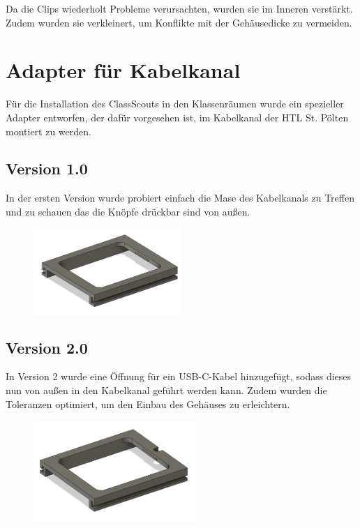 \begin{inhalt}
Da die Clips wiederholt Probleme verursachten, wurden sie im Inneren verstärkt.  
Zudem wurden sie verkleinert, um Konflikte mit der Gehäusedicke zu vermeiden.


\newpage

\section{Adapter für Kabelkanal}

Für die Installation des ClassScouts in den Klassenräumen wurde ein spezieller Adapter entworfen, der dafür vorgesehen ist, im Kabelkanal der HTL St. Pölten montiert zu werden.


\subsection{Version 1.0}

In der ersten Version wurde probiert einfach die Mase des Kabelkanals zu Treffen und zu schauen das die Knöpfe drückbar sind von außen.

\begin{figure}[!htb]
\centering
\includegraphics[width=0.5\textwidth]{files/Thomas/pics/adapter/1.0/image.png}
\caption[Bildbezeichnung für Abbildungsverzeichnis]{}
\label{fig:gehaeuse_internet_bild}
\end{figure}


\subsection{Version 2.0}

In Version 2 wurde eine Öffnung für ein USB-C-Kabel hinzugefügt, sodass dieses nun von außen in den Kabelkanal geführt werden kann.  
Zudem wurden die Toleranzen optimiert, um den Einbau des Gehäuses zu erleichtern.


\begin{figure}[!htb]
\centering
\includegraphics[width=0.55\textwidth]{files/Thomas/pics/adapter/2.0/image.png}
\caption[Bildbezeichnung für Abbildungsverzeichnis]{}
\label{fig:gehaeuse_internet_bild}
\end{figure}




\end{inhalt}
